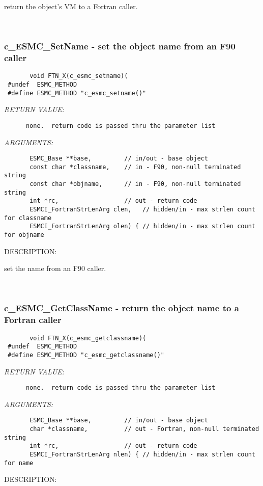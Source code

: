        return the object's VM to a Fortran caller.
   
 
\mbox{}\hrulefill\
 
\subsubsection [c\_ESMC\_SetName] {c\_ESMC\_SetName - set the object name from an F90 caller}


  
\begin{verbatim}       void FTN_X(c_esmc_setname)(
 #undef  ESMC_METHOD
 #define ESMC_METHOD "c_esmc_setname()"\end{verbatim}{\em RETURN VALUE:}
\begin{verbatim}      none.  return code is passed thru the parameter list
   \end{verbatim}{\em ARGUMENTS:}
\begin{verbatim}       ESMC_Base **base,         // in/out - base object
       const char *classname,    // in - F90, non-null terminated string
       const char *objname,      // in - F90, non-null terminated string
       int *rc,                  // out - return code
       ESMCI_FortranStrLenArg clen,   // hidden/in - max strlen count for classname
       ESMCI_FortranStrLenArg olen) { // hidden/in - max strlen count for objname
   \end{verbatim}
{\sf DESCRIPTION:\\ }


       set the name from an F90 caller.
   
 
\mbox{}\hrulefill\
 
\subsubsection [c\_ESMC\_GetClassName] {c\_ESMC\_GetClassName - return the object name to a Fortran caller}


  
\begin{verbatim}       void FTN_X(c_esmc_getclassname)(
 #undef  ESMC_METHOD
 #define ESMC_METHOD "c_esmc_getclassname()"\end{verbatim}{\em RETURN VALUE:}
\begin{verbatim}      none.  return code is passed thru the parameter list
   \end{verbatim}{\em ARGUMENTS:}
\begin{verbatim}       ESMC_Base **base,         // in/out - base object
       char *classname,          // out - Fortran, non-null terminated string
       int *rc,                  // out - return code
       ESMCI_FortranStrLenArg nlen) { // hidden/in - max strlen count for name
   \end{verbatim}
{\sf DESCRIPTION:\\ }


